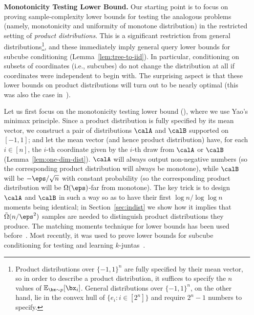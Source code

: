 \noindent\textbf{Monotonicity Testing Lower Bound.} Our starting point is to focus on proving sample-complexity lower bounds for testing the analogous problems (namely, monotonicity and uniformity of monotone distribution) in the restricted setting of \emph{product distributions}. This is a significant restriction from general distributions\footnote{Product distributions over $\{-1,1\}^n$ are fully specified by their mean vector, so in order to describe a product distribution, it suffices to specify the $n$ values of $\mathbb{E}_{\bx \sim p}[\bx_i]$. General distributions over $\{-1,1\}^n$, on the other hand, lie in the convex hull of $\{ e_i : i \in [2^n]\}$ and require $2^{n}-1$ numbers to specify.}, and these immediately imply general query lower bounds for subcube conditioning (Lemma~\ref{lem:tree-to-iid}). In particular, conditioning on subsets of coordinates (i.e., subcubes) do not change the distribution at all if coordinates were independent to begin with. The surprising aspect is that these lower bounds on product distributions will turn out to be nearly optimal (this was also the case in~\cite{CCKLW21, CJLW21b}).

Let us first focus on the monotonicity testing lower bound (), where we use Yao's minimax
principle. Since a product distribution is fully specified by its mean vector, we construct a pair of distributions $\calA$ and $\calB$ supported on $[-1,1]$; and let the mean vector (and hence product distribution) have, for each $i \in [n]$, the $i$-th coordinate given by the $i$-th draw from $\calA$ or $\calB$ (Lemma~\ref{lem:one-dim-dist}). $\calA$ will always output non-negative numbers (so the corresponding product distribution will always be monotone), while $\calB$ will be $-\eps / \sqrt{n}$ with constant probability (so the corresponding product distribution will be $\Omega(\eps)$-far from monotone). The key trick is to design $\calA$ and $\calB$ in such a way so as to have their first $\log n / \log \log n$ moments being identical; in Section~\ref{sec:indist} we show how it implies that $\tilde{\Omega}(n/\eps^2)$ samples are needed to distinguish product distributions they produce.
The matching moments technique for lower bounds has been used before~\cite{RRSS09, V11}. Most recently, it was used to prove lower bounds for subcube conditioning for testing and learning $k$-juntas~\cite{CJLW21b}.



